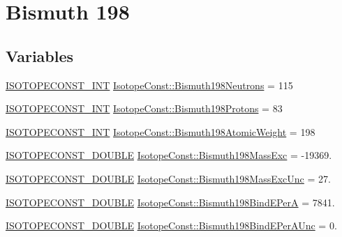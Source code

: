 \hypertarget{group___isotope_const-_bismuth-_bi198}{}\section{Bismuth 198}
\label{group___isotope_const-_bismuth-_bi198}
\subsection*{Variables}
\begin{DoxyCompactItemize}
\item 
\mbox{\hyperlink{group___isotope_const-_macros_ga5f18360b3e99483a35c32d789e62621c}{I\+S\+O\+T\+O\+P\+E\+C\+O\+N\+S\+T\+\_\+\+I\+NT}} \mbox{\hyperlink{group___isotope_const-_bismuth-_bi198_ga776fc61e3a20c020d59746cb0a019fec}{Isotope\+Const\+::\+Bismuth198\+Neutrons}} = 115
\item 
\mbox{\hyperlink{group___isotope_const-_macros_ga5f18360b3e99483a35c32d789e62621c}{I\+S\+O\+T\+O\+P\+E\+C\+O\+N\+S\+T\+\_\+\+I\+NT}} \mbox{\hyperlink{group___isotope_const-_bismuth-_bi198_ga927bf064e53f35b713d0c5e2a223e49a}{Isotope\+Const\+::\+Bismuth198\+Protons}} = 83
\item 
\mbox{\hyperlink{group___isotope_const-_macros_ga5f18360b3e99483a35c32d789e62621c}{I\+S\+O\+T\+O\+P\+E\+C\+O\+N\+S\+T\+\_\+\+I\+NT}} \mbox{\hyperlink{group___isotope_const-_bismuth-_bi198_ga39fff90403e2ac87411d851282840378}{Isotope\+Const\+::\+Bismuth198\+Atomic\+Weight}} = 198
\item 
\mbox{\hyperlink{group___isotope_const-_macros_ga8f45a7272ce02c0b4c65c44636ed719a}{I\+S\+O\+T\+O\+P\+E\+C\+O\+N\+S\+T\+\_\+\+D\+O\+U\+B\+LE}} \mbox{\hyperlink{group___isotope_const-_bismuth-_bi198_ga49145223b47bc3b27512714b2fba7e4c}{Isotope\+Const\+::\+Bismuth198\+Mass\+Exc}} = -\/19369.
\item 
\mbox{\hyperlink{group___isotope_const-_macros_ga8f45a7272ce02c0b4c65c44636ed719a}{I\+S\+O\+T\+O\+P\+E\+C\+O\+N\+S\+T\+\_\+\+D\+O\+U\+B\+LE}} \mbox{\hyperlink{group___isotope_const-_bismuth-_bi198_gaed5900e751c7eddef7ae6458aca53720}{Isotope\+Const\+::\+Bismuth198\+Mass\+Exc\+Unc}} = 27.
\item 
\mbox{\hyperlink{group___isotope_const-_macros_ga8f45a7272ce02c0b4c65c44636ed719a}{I\+S\+O\+T\+O\+P\+E\+C\+O\+N\+S\+T\+\_\+\+D\+O\+U\+B\+LE}} \mbox{\hyperlink{group___isotope_const-_bismuth-_bi198_ga8d3264153a72ac54a9126472dfab8cc8}{Isotope\+Const\+::\+Bismuth198\+Bind\+E\+PerA}} = 7841.
\item 
\mbox{\hyperlink{group___isotope_const-_macros_ga8f45a7272ce02c0b4c65c44636ed719a}{I\+S\+O\+T\+O\+P\+E\+C\+O\+N\+S\+T\+\_\+\+D\+O\+U\+B\+LE}} \mbox{\hyperlink{group___isotope_const-_bismuth-_bi198_ga8b9396196b98e0597f9fbd82fa65ac27}{Isotope\+Const\+::\+Bismuth198\+Bind\+E\+Per\+A\+Unc}} = 0.

\end{DoxyCompactItemize}
